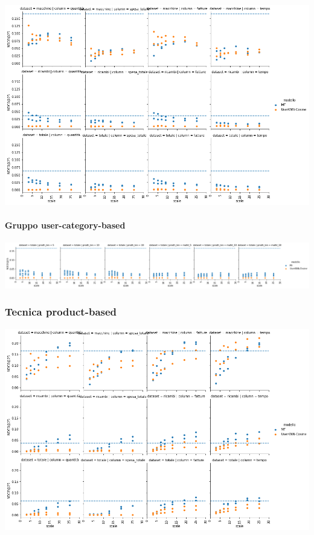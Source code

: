 \includegraphics[width=16cm]{figures/risultati_ordered_singolo.png}


\paragraph{Gruppo user-category-based}

\includegraphics[width=16cm]{figures/risultati_ordered_categoria.png}

\subsubsection{Tecnica product-based}

\includegraphics[width=16cm]{figures/prodotto.png}

